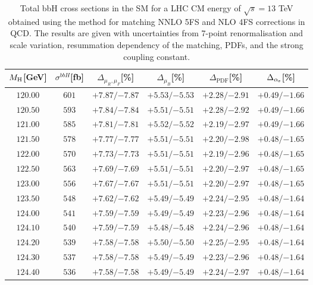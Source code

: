 \begin{table}[ht!]
\caption{Total bbH{} cross sections in the SM for a LHC CM energy of $\sqrt{s}=13$ TeV obtained using the \nlonnllpart{} method for matching NNLO 5FS and NLO 4FS corrections in QCD. The results are given with uncertainties from 7-point renormalisation and scale variation, resummation dependency of the matching, PDFs, and the strong coupling constant.}
\label{tab:bbH13}
\begin{center}%
\begin{small}%
\begin{tabular}{cccccc}%
\toprule
$M_\mathrm{H}$[GeV] & $\sigma^{bbH}$[fb] & $\Delta_{\mu_{R},\mu_{F}}$[\%] & $\Delta_{\mu_{B}}$[\%] & $\Delta_{\mathrm{PDF}}$[\%] & $\Delta_{\alpha_{\mathrm{s}}}$[\%] \\
\midrule
$120.00$ & $601$ & ${+7.87}/{-7.87}$ & ${+5.53}/{-5.53}$ & ${+2.28}/{-2.91}$ & ${+0.49}/{-1.66}$ \\
$120.50$ & $593$ & ${+7.84}/{-7.84}$ & ${+5.51}/{-5.51}$ & ${+2.28}/{-2.92}$ & ${+0.49}/{-1.66}$ \\
$121.00$ & $585$ & ${+7.81}/{-7.81}$ & ${+5.52}/{-5.52}$ & ${+2.19}/{-2.97}$ & ${+0.49}/{-1.66}$ \\
$121.50$ & $578$ & ${+7.77}/{-7.77}$ & ${+5.51}/{-5.51}$ & ${+2.20}/{-2.98}$ & ${+0.48}/{-1.65}$ \\
$122.00$ & $570$ & ${+7.73}/{-7.73}$ & ${+5.51}/{-5.51}$ & ${+2.19}/{-2.96}$ & ${+0.48}/{-1.65}$ \\
$122.50$ & $563$ & ${+7.69}/{-7.69}$ & ${+5.51}/{-5.51}$ & ${+2.20}/{-2.97}$ & ${+0.48}/{-1.65}$ \\
$123.00$ & $556$ & ${+7.67}/{-7.67}$ & ${+5.51}/{-5.51}$ & ${+2.20}/{-2.97}$ & ${+0.48}/{-1.65}$ \\
$123.50$ & $548$ & ${+7.62}/{-7.62}$ & ${+5.49}/{-5.49}$ & ${+2.24}/{-2.95}$ & ${+0.48}/{-1.64}$ \\
$124.00$ & $541$ & ${+7.59}/{-7.59}$ & ${+5.49}/{-5.49}$ & ${+2.23}/{-2.96}$ & ${+0.48}/{-1.64}$ \\
$124.10$ & $540$ & ${+7.59}/{-7.59}$ & ${+5.48}/{-5.48}$ & ${+2.24}/{-2.96}$ & ${+0.48}/{-1.64}$ \\
$124.20$ & $539$ & ${+7.58}/{-7.58}$ & ${+5.50}/{-5.50}$ & ${+2.25}/{-2.95}$ & ${+0.48}/{-1.64}$ \\
$124.30$ & $537$ & ${+7.58}/{-7.58}$ & ${+5.49}/{-5.49}$ & ${+2.23}/{-2.96}$ & ${+0.48}/{-1.64}$ \\
$124.40$ & $536$ & ${+7.58}/{-7.58}$ & ${+5.49}/{-5.49}$ & ${+2.24}/{-2.97}$ & ${+0.48}/{-1.64}$ \\

\end{tabular}
\end{small}
\end{center}
\end{table}
